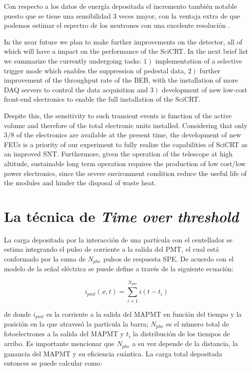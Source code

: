 Con respecto a los datos de energía depositada el incremento también notable puesto que se tiene una sensibilidad $3$ veces mayor, con la ventaja extra de que podemos estimar el espectro de los neutrones con una excelente resolución \cite{ysasai17}.

In the near future we plan to make further improvements on the detector, all of which will have a impact on the performance of the SciCRT. In the next brief list we summarize the currently undergoing tasks: $1\left.\right)$ implementation of a selective trigger mode which enables the suppression of pedestal data, $2\left.\right)$ further improvement of the throughput rate of the BEB, with the installation of more DAQ servers to control the data acquisition and $3\left.\right)$ development of new low-cost front-end electronics to enable the full installation of the SciCRT.

Despite this, the sensitivity to such transient events is function of the active volume and therefore of the total electronic units installed. Considering that only $3/8$ of the electronics are available at the present time, the development of new FEUs is a priority of our experiment to fully realize the capabilities of SciCRT as an improved SNT. Furthermore, given the operation of the telescope at high altitude, sustainable long term operation requires the production of low cost/low power electronics, since the severe environment condition reduce the useful life of the modules and hinder the disposal of waste heat.

\section{La técnica de \emph{Time over threshold}}

La carga depositada por la interacción de una partícula con el centellador se estima integrando el pulso de corriente a la salida del PMT, el cual está conformado por la suma de $N_{phe}$ pulsos de respuesta SPE. De acuerdo con \cite{sanchez10} el modelo de la señal eléctrica se puede define a través de la siguiente ecuación:

\begin{equation}\label{equ:3.1}
i_{pmt}\left(x,t\right)=\sum_{i=1}^{N_{phe}}i\left(t-t_{i}\right)
\end{equation}

de donde $i_{pmt}$ es la corriente a la salida del MAPMT en función del tiempo y la posición en la que atravesó la partícula la barra; $N_{phe}$ es el número total de fotoelectrones a la salida del MAPMT y $t_{i}$ la distribución de los tiempos de arribo. Es importante mencionar que $N_{phe}$ a su vez depende de la distancia, la ganancia del MAPMT y su eficiencia cuántica. La carga total depositada entonces se puede calcular como:

